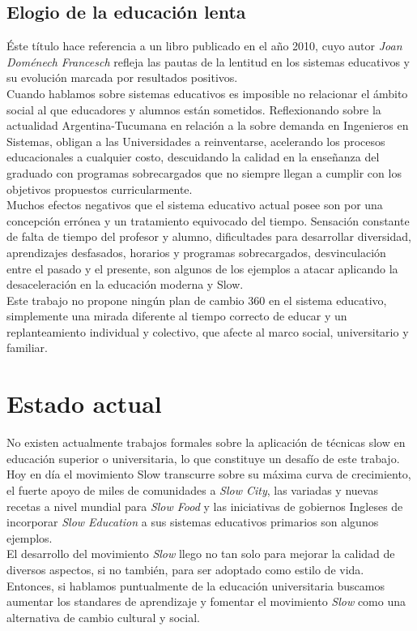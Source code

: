 \subsection{Elogio de la educaci\'on lenta}
\'Este t\'itulo hace referencia a un libro publicado en el a\~no 2010, cuyo autor \textit{Joan Dom\'enech Francesch} refleja las pautas de la lentitud en los 
sistemas educativos y su evoluci\'on marcada por resultados positivos.\\
Cuando hablamos sobre sistemas educativos es imposible no relacionar el \'ambito social al que educadores y alumnos est\'an sometidos. Reflexionando sobre
la actualidad Argentina-Tucumana en relaci\'on a la sobre demanda en Ingenieros en Sistemas, obligan a las Universidades a reinventarse, acelerando los procesos 
educacionales a cualquier costo, descuidando la calidad en la ense\~nanza del graduado con programas sobrecargados que no siempre llegan a cumplir con los 
objetivos propuestos curricularmente.\\
Muchos efectos negativos que el sistema educativo actual posee son por una concepci\'on err\'onea y un tratamiento equivocado del tiempo. Sensaci\'on constante
de falta de tiempo del profesor y alumno, dificultades para desarrollar diversidad, aprendizajes desfasados, horarios y programas sobrecargados, desvinculaci\'on
entre el pasado y el presente, son algunos de los ejemplos a atacar aplicando la desaceleraci\'on en la educaci\'on moderna y Slow.\\

Este trabajo no propone ning\'un plan de cambio 360 en el sistema educativo, simplemente una mirada diferente al tiempo correcto de educar y un replanteamiento 
individual y colectivo, que afecte al marco social, universitario y familiar.

\section{Estado actual}\label{ch1:opts}
No existen actualmente trabajos formales sobre la aplicaci\'on de t\'ecnicas slow en educaci\'on superior o universitaria, lo que constituye un desaf\'io de este
trabajo.\\
Hoy en d\'ia el movimiento Slow transcurre sobre su m\'axima curva de crecimiento, el fuerte apoyo de miles de comunidades a \textit{Slow City}, las variadas y 
nuevas recetas a nivel mundial para \textit{Slow Food} y las iniciativas de gobiernos Ingleses de incorporar \textit{Slow Education} a sus sistemas educativos
primarios son algunos ejemplos.\\
El desarrollo del movimiento \textit{Slow} llego no tan solo para mejorar la calidad de diversos aspectos, si no tambi\'en, para ser adoptado como estilo de vida.
Entonces, si hablamos puntualmente de la educaci\'on universitaria buscamos aumentar los standares de aprendizaje y fomentar el movimiento \textit{Slow} como una
alternativa de cambio cultural y social.

